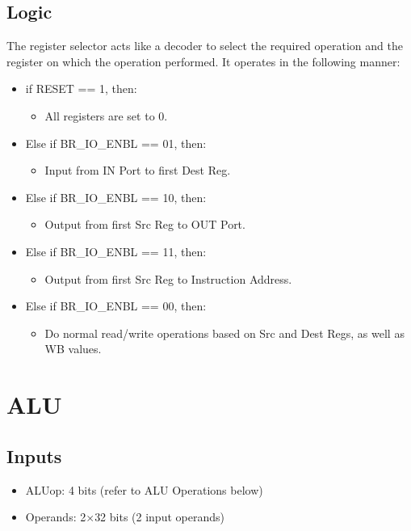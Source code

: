 \subsection{Logic}
The register selector acts like a decoder to select the required operation and the register on which the operation performed. It operates in the following manner:
\begin{itemize}
    \item if RESET == 1, then:
    \begin{itemize}
        \item All registers are set to 0.
    \end{itemize}
    \item Else if BR\_IO\_ENBL == 01, then:
    \begin{itemize}
        \item Input from IN Port to first Dest Reg.
    \end{itemize}
    \item Else if BR\_IO\_ENBL == 10, then:
    \begin{itemize}
        \item Output from first Src Reg to OUT Port.
    \end{itemize}
    \item Else if BR\_IO\_ENBL == 11, then:
    \begin{itemize}
        \item Output from first Src Reg to Instruction Address.
    \end{itemize}
    \item Else if BR\_IO\_ENBL == 00, then:
    \begin{itemize}
        \item Do normal read/write operations based on Src and Dest Regs, as well as WB values.
    \end{itemize}
\end{itemize}


\section{ALU}

\subsection{Inputs}
\begin{itemize}
    \item ALUop: 4 bits (refer to ALU Operations below)
    \item Operands: 2$\times$32 bits (2 input operands)
\end{itemize}

